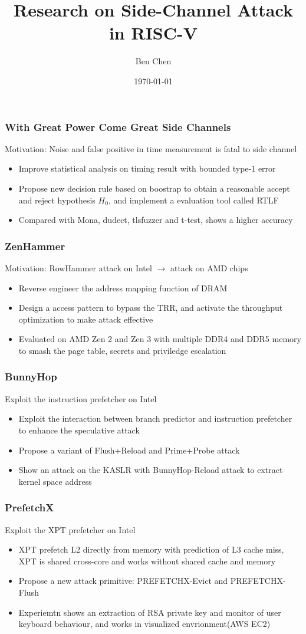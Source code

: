 \documentclass{beamer}
\title{Research on Side-Channel Attack in RISC-V}
\author{Ben Chen}
\institute{Dept of Computer Science and Engineering, SUSTech}
\date{\today}
\begin{document}
\frame{\titlepage}

\begin{frame}
  \frametitle{With Great Power Come Great Side Channels\cite{with-great}}
  Motivation: Noise and false positive in time measurement is fatal to side channel
  \begin{itemize}
    \item Improve statistical analysis on timing result with bounded type-1 error
    \item Propose new decision rule based on boostrap to obtain a reasonable accept and reject hypothesis $H_0$, and implement a evaluation tool called RTLF
    \item Compared with Mona, dudect, tlsfuzzer and t-test, shows a higher accuracy
  \end{itemize}
\end{frame}

\begin{frame}
  \frametitle{ZenHammer\cite{zenhammer}}
  Motivation: RowHammer attack on Intel $\rightarrow$ attack on AMD chips
  \begin{itemize}
    \item Reverse engineer the address mapping function of DRAM
    \item Design a access pattern to bypass the TRR, and activate the throughput optimization to make attack effective
    \item Evaluated on AMD Zen 2 and Zen 3 with multiple DDR4 and DDR5 memory to smash the page table, secrets and priviledge escalation
  \end{itemize}
\end{frame}

\begin{frame}
  \frametitle{BunnyHop\cite{bunnyhop}}
  Exploit the instruction prefetcher on Intel
  \begin{itemize}
    \item Exploit the interaction between branch predictor and instruction prefetcher to enhance the speculative attack
    \item Propose a variant of Flush+Reload and Prime+Probe attack
    \item Show an attack on the KASLR with BunnyHop-Reload attack to extract kernel space address
  \end{itemize}
\end{frame}

\begin{frame}
  \frametitle{PrefetchX\cite{prefetchx}}
  Exploit the XPT prefetcher on Intel
  \begin{itemize}
    \item XPT prefetch L2 directly from memory with prediction of L3 cache miss, XPT is shared cross-core and works without shared cache and memory
    \item Propose a new attack primitive: PREFETCHX-Evict and PREFETCHX-Flush
    \item Experiemtn shows an extraction of RSA private key and monitor of user keyboard behaviour, and works in visualized envrionment(AWS EC2)
  \end{itemize}
\end{frame}
\end{document}
